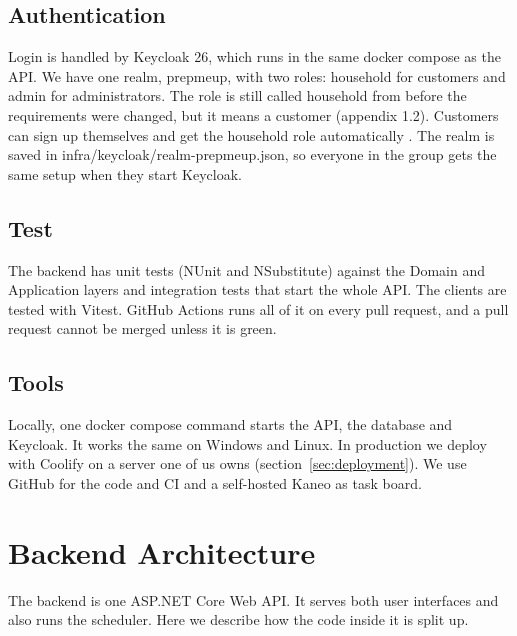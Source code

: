 \documentclass[a4paper,11pt]{article}
\begin{document}
\subsection{Authentication}
Login is handled by Keycloak 26, which runs in the same docker compose as the API. We have one realm, prepmeup, with two roles: household for customers and admin for administrators. The role is still called household from before the requirements were changed, but it means a customer (appendix 1.2). Customers can sign up themselves and get the household role automatically \cite[secs.~Enabling user registration and Using default roles]{keycloak-server-admin-guide}. The realm is saved in infra/keycloak/realm-prepmeup.json, so everyone in the group gets the same setup when they start Keycloak.

\subsection{Test}
The backend has unit tests (NUnit and NSubstitute) against the Domain and Application layers and integration tests that start the whole API. The clients are tested with Vitest. GitHub Actions runs all of it on every pull request, and a pull request cannot be merged unless it is green.

\subsection{Tools}
Locally, one docker compose command starts the API, the database and Keycloak. It works the same on Windows and Linux. In production we deploy with Coolify on a server one of us owns (section~\ref{sec:deployment}). We use GitHub for the code and CI and a self-hosted Kaneo as task board.

\section{Backend Architecture}
\label{sec:backend}
The backend is one ASP.NET Core Web API. It serves both user interfaces and also runs the scheduler. Here we describe how the code inside it is split up.
\end{document}
